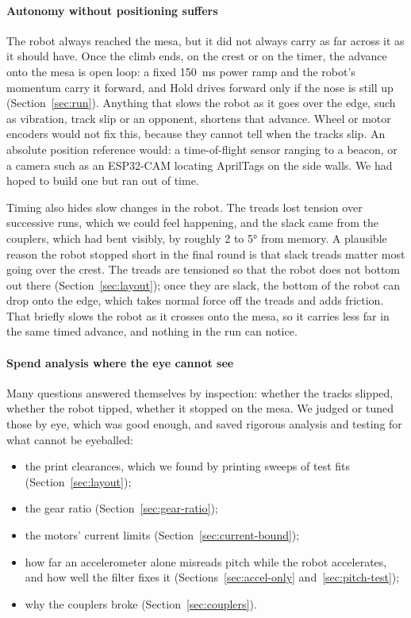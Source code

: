 \paragraph{Autonomy without positioning suffers}
The robot always reached the mesa, but it did not always carry as far across it as it should have. Once the climb ends, on the crest or on the timer, the advance onto the mesa is open loop: a fixed \qty{150}{ms} power ramp and the robot's momentum carry it forward, and Hold drives forward only if the nose is still up (Section~\ref{sec:run}). Anything that slows the robot as it goes over the edge, such as vibration, track slip or an opponent, shortens that advance. Wheel or motor encoders would not fix this, because they cannot tell when the tracks slip. An absolute position reference would: a time-of-flight sensor ranging to a beacon, or a camera such as an ESP32-CAM locating AprilTags on the side walls. We had hoped to build one but ran out of time.

Timing also hides slow changes in the robot. The treads lost tension over successive runs, which we could feel happening, and the slack came from the couplers, which had bent visibly, by roughly 2 to \ang{5} from memory. A plausible reason the robot stopped short in the final round is that slack treads matter most going over the crest. The treads are tensioned so that the robot does not bottom out there (Section~\ref{sec:layout}); once they are slack, the bottom of the robot can drop onto the edge, which takes normal force off the treads and adds friction. That briefly slows the robot as it crosses onto the mesa, so it carries less far in the same timed advance, and nothing in the run can notice.

\paragraph{Spend analysis where the eye cannot see}
Many questions answered themselves by inspection: whether the tracks slipped, whether the robot tipped, whether it stopped on the mesa. We judged or tuned those by eye, which was good enough, and saved rigorous analysis and testing for what cannot be eyeballed:
\begin{itemize}
  \item the print clearances, which we found by printing sweeps of test fits (Section~\ref{sec:layout});
  \item the gear ratio (Section~\ref{sec:gear-ratio});
  \item the motors' current limits (Section~\ref{sec:current-bound});
  \item how far an accelerometer alone misreads pitch while the robot accelerates, and how well the filter fixes it (Sections~\ref{sec:accel-only} and~\ref{sec:pitch-test});
  \item why the couplers broke (Section~\ref{sec:couplers}).
\end{itemize}
